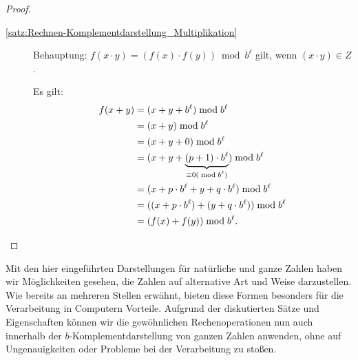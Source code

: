 \documentclass{article}
\begin{document}
\begin{proof}
\begin{description}
        \item[\ref{satz:Rechnen-Komplementdarstellung_Multiplikation}] Behauptung: $f(x \cdot y) = (f(x) \cdot f(y)) \bmod b^\ell$ gilt, wenn $(x\cdot y) \in Z$.
          
          Es gilt:
          \begin{align*}
            f(x+y) &= (x+y+b^\ell) \bmod b^\ell \\
            &= (x+y) \bmod b^\ell \\
            &= (x+y+0) \bmod b^\ell \\
            &= (x+y+ \underbrace{(p+1)\cdot b^\ell}_{\mathclap{\equiv 0 (\bmod b^\ell)}}) \bmod b^\ell \\
            &= (x+ p\cdot b^\ell + y + q\cdot b^\ell) \bmod b^\ell \\
            &= ((x + p \cdot b^\ell) + (y + q\cdot b^\ell)) \bmod b^\ell \\
            &= (f(x) + f(y)) \bmod b^\ell.
          \end{align*}
      \end{description}
    \end{proof}

  \vspace{\baselineskip}

  Mit den hier eingeführten Darstellungen für natürliche und ganze Zahlen haben wir Möglichkeiten gesehen, die Zahlen auf alternative Art und Weise darzustellen.
  Wie bereits an mehreren Stellen erwähnt, bieten diese Formen besonders für die Verarbeitung in Computern Vorteile.
  Aufgrund der diskutierten Sätze und Eigenschaften können wir die gewöhnlichen Rechenoperationen nun auch innerhalb der $b$-Komplementdarstellung von ganzen Zahlen anwenden, ohne auf Ungenauigkeiten oder Probleme bei der Verarbeitung zu stoßen.

\newpage
\printbibliography[heading=bibintoc]
\end{document}

